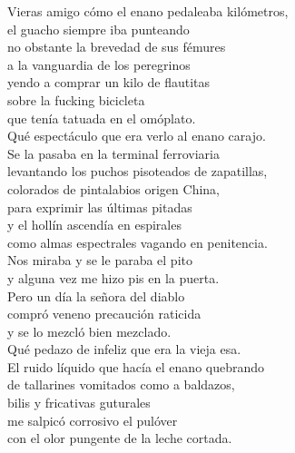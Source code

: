 

Vieras amigo cómo el enano pedaleaba kilómetros, \\
el guacho siempre iba punteando \\
no obstante la brevedad de sus fémures  \\
a la vanguardia de los peregrinos \\
yendo a comprar un kilo de flautitas \\
sobre la fucking bicicleta \\
que tenía tatuada en el omóplato. \\
Qué espectáculo que era verlo al enano carajo. \\
Se la pasaba en la terminal ferroviaria \\
levantando los puchos pisoteados de zapatillas, \\
colorados de pintalabios origen China, \\
para exprimir las últimas pitadas \\
y el hollín ascendía en espirales \\
como almas espectrales vagando en penitencia. \\
Nos miraba y se le paraba el pito \\
y alguna vez me hizo pis en la puerta. \\
Pero un día la señora del diablo \\
compró veneno precaución raticida \\
y se lo mezcló bien mezclado. \\
Qué pedazo de infeliz que era la vieja esa. \\
El ruido líquido que hacía el enano quebrando \\
de tallarines vomitados como a baldazos, \\
bilis y fricativas guturales \\
me salpicó corrosivo el pulóver \\
con el olor pungente de la leche cortada. \\

